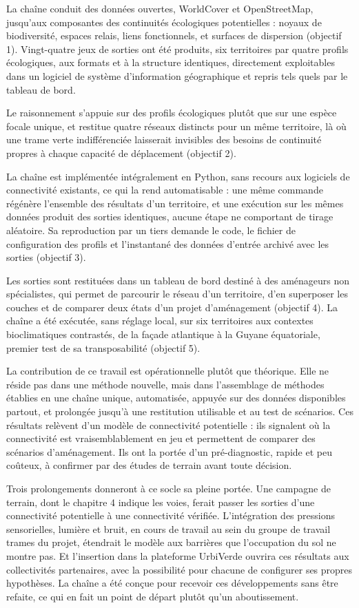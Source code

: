 \documentclass[a4paper,12pt]{report}
\begin{document}
La chaîne conduit des données ouvertes, WorldCover et OpenStreetMap, jusqu'aux composantes des continuités écologiques potentielles : noyaux de biodiversité, espaces relais, liens fonctionnels, et surfaces de dispersion (objectif 1). Vingt-quatre jeux de sorties ont été produits, six territoires par quatre profils écologiques, aux formats et à la structure identiques, directement exploitables dans un logiciel de système d'information géographique et repris tels quels par le tableau de bord.

Le raisonnement s'appuie sur des profils écologiques plutôt que sur une espèce focale unique, et restitue quatre réseaux distincts pour un même territoire, là où une trame verte indifférenciée laisserait invisibles des besoins de continuité propres à chaque capacité de déplacement (objectif 2).

La chaîne est implémentée intégralement en Python, sans recours aux logiciels de connectivité existants, ce qui la rend automatisable : une même commande régénère l'ensemble des résultats d'un territoire, et une exécution sur les mêmes données produit des sorties identiques, aucune étape ne comportant de tirage aléatoire. Sa reproduction par un tiers demande le code, le fichier de configuration des profils et l'instantané des données d'entrée archivé avec les sorties (objectif 3).

Les sorties sont restituées dans un tableau de bord destiné à des aménageurs non spécialistes, qui permet de parcourir le réseau d'un territoire, d'en superposer les couches et de comparer deux états d'un projet d'aménagement (objectif 4). La chaîne a été exécutée, sans réglage local, sur six territoires aux contextes bioclimatiques contrastés, de la façade atlantique à la Guyane équatoriale, premier test de sa transposabilité (objectif 5).

La contribution de ce travail est opérationnelle plutôt que théorique. Elle ne réside pas dans une méthode nouvelle, mais dans l'assemblage de méthodes établies en une chaîne unique, automatisée, appuyée sur des données disponibles partout, et prolongée jusqu'à une restitution utilisable et au test de scénarios. Ces résultats relèvent d'un modèle de connectivité potentielle : ils signalent où la connectivité est vraisemblablement en jeu et permettent de comparer des scénarios d'aménagement. Ils ont la portée d'un pré-diagnostic, rapide et peu coûteux, à confirmer par des études de terrain avant toute décision.

Trois prolongements donneront à ce socle sa pleine portée. Une campagne de terrain, dont le chapitre 4 indique les voies, ferait passer les sorties d'une connectivité potentielle à une connectivité vérifiée. L'intégration des pressions sensorielles, lumière et bruit, en cours de travail au sein du groupe de travail trames du projet, étendrait le modèle aux barrières que l'occupation du sol ne montre pas. Et l'insertion dans la plateforme UrbiVerde ouvrira ces résultats aux collectivités partenaires, avec la possibilité pour chacune de configurer ses propres hypothèses. La chaîne a été conçue pour recevoir ces développements sans être refaite, ce qui en fait un point de départ plutôt qu'un aboutissement.
\end{document}
